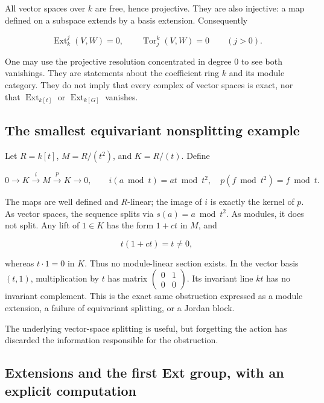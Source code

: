 \documentclass[
  11pt,
]{article}
\begin{document}
All vector spaces over \(k\) are free, hence projective. They are also
injective: a map defined on a subspace extends by a basis extension.
Consequently

\[\operatorname{Ext}^j_k(V,W)=0,\qquad
\operatorname{Tor}^k_j(V,W)=0\qquad(j>0).\]

One may use the projective resolution concentrated in degree \(0\) to
see both vanishings. They are statements about the coefficient ring
\(k\) and its module category. They do not imply that every complex of
vector spaces is exact, nor that \(\operatorname{Ext}_{k[t]}\) or
\(\operatorname{Ext}_{k[G]}\) vanishes.

\subsection{The smallest equivariant nonsplitting
example}\label{the-smallest-equivariant-nonsplitting-example}

Let \(R=k[t]\), \(M=R/(t^2)\), and \(K=R/(t)\). Define

\[0\longrightarrow K\xrightarrow{i}M\xrightarrow{p}K\longrightarrow0,
\qquad i(a\bmod t)=at\bmod t^2,\quad
p(f\bmod t^2)=f\bmod t.\]

The maps are well defined and \(R\)-linear; the image of \(i\) is
exactly the kernel of \(p\). As vector spaces, the sequence splits via
\(s(a)=a\bmod t^2\). As modules, it does not split. Any lift of
\(1\in K\) has the form \(1+ct\) in \(M\), and

\[t(1+ct)=t\ne0,\]

whereas \(t\cdot1=0\) in \(K\). Thus no module-linear section exists. In
the vector basis \((t,1)\), multiplication by \(t\) has matrix
\(\begin{pmatrix}0&1\\0&0\end{pmatrix}\). Its invariant line \(kt\) has
no invariant complement. This is the exact same obstruction expressed as
a module extension, a failure of equivariant splitting, or a Jordan
block.

The underlying vector-space splitting is useful, but forgetting the
action has discarded the information responsible for the obstruction.

\subsection{Extensions and the first Ext group, with an explicit
computation}\label{extensions-and-the-first-ext-group-with-an-explicit-computation}
\end{document}
